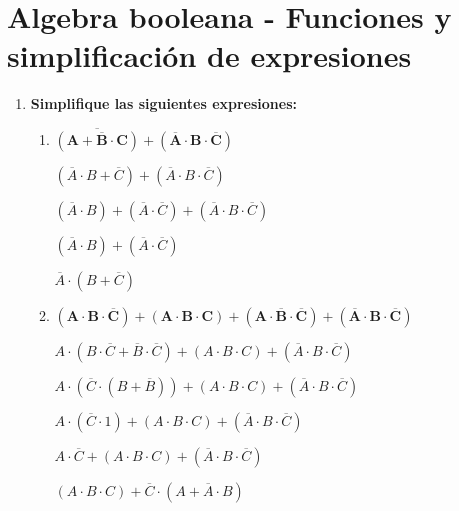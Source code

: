 \documentclass[12pt]{article}
\begin{document}
    
  
    \section*{\centering Algebra booleana - Funciones y simplificación de expresiones}

        \vspace{0.6cm}
        
        \begin{enumerate}[label = \textbf{\alph*.}]
            \item \textbf{Simplifique las siguientes expresiones:}
                \begin{enumerate}[label = \textbf{\arabic*.}]
                    \item $\mathbf{\overline{(A + \overline{B} \cdot C)} + (\overline{A} \cdot B \cdot \overline{C})}$
                        \par$(\overline{A} \cdot B + \overline{C}) +  (\overline{A} \cdot B \cdot \overline{C})$
                        \par$(\overline{A} \cdot B) + (\overline{A} \cdot \overline{C}) +  (\overline{A} \cdot B \cdot \overline{C})$
                        \par$(\overline{A} \cdot B) + (\overline{A} \cdot \overline{C}) $
                        \par$\overline{A} \cdot (B + \overline{C})$ \vspace{0.5cm}
                    
                    \item $\mathbf{(A \cdot B \cdot \overline{C}) + (A \cdot B \cdot C) + (A \cdot \overline{B} \cdot \overline{C}) + (\overline{A}\cdot B \cdot \overline{C})}$
                        \par$A \cdot (B \cdot \overline{C} + \overline{B} \cdot \overline{C}) + (A \cdot B \cdot C) + (\overline{A}\cdot B \cdot \overline{C})$
                        \par$A \cdot (\overline{C} \cdot (B + \overline{B})) + (A \cdot B \cdot C) + (\overline{A}\cdot B \cdot \overline{C})$
                        \par$A \cdot (\overline{C} \cdot 1) + (A \cdot B \cdot C) + (\overline{A}\cdot B \cdot \overline{C})$
                        \par$A \cdot \overline{C} + (A \cdot B \cdot C) + (\overline{A}\cdot B \cdot \overline{C})$
                        \par$(A \cdot B \cdot C) +  \overline{C} \cdot (A + \overline{A} \cdot B)$
                        \vspace{0.5cm}
                    

\end{enumerate}
\end{enumerate}
\end{document}
